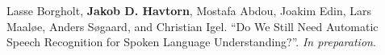 \begin{enumerate}[leftmargin=18mm,topsep=0mm,label={[\Alph*]}]
    \setcounter{enumi}{2}

    \item {}

    \item {}

    \item {}

    \item {}

    \item Lasse Borgholt, \textbf{Jakob D. Havtorn}, Mostafa Abdou, Joakim Edin, Lars Maaløe, Anders Søgaard, and Christian Igel. “Do We Still Need Automatic Speech Recognition for Spoken Language Understanding?”. \textit{In preparation}.

\end{enumerate}
\vspace*{\fill}
